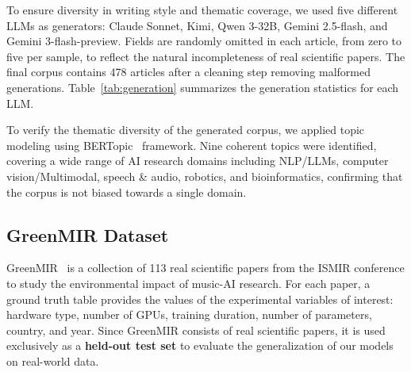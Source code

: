 \documentclass{article}
\theoremstyle{plain}
\theoremstyle{definition}
\theoremstyle{remark}
\begin{document}
To ensure diversity in writing style and thematic coverage, we used five different LLMs as generators: Claude Sonnet, Kimi, Qwen 3-32B, Gemini 2.5-flash, and Gemini 3-flash-preview. Fields are randomly omitted in each article, from zero to five per sample, to reflect the natural incompleteness of real scientific papers. The final corpus contains 478 articles after a cleaning step removing malformed generations. Table~\ref{tab:generation} summarizes the generation statistics for each LLM.

\begin{table}[H]
\centering
{}
\caption{Generation statistics per LLM.}
\label{tab:generation}
\end{table}

To verify the thematic diversity of the generated corpus, we applied topic modeling using BERTopic~\cite{grootendorst2022bertopic} framework. Nine coherent topics were identified, covering a wide range of AI research domains including NLP/LLMs, computer vision/Multimodal, speech \& audio, robotics, and bioinformatics, confirming that the corpus is not biased towards a single domain.

\subsection{GreenMIR Dataset}                                                 
GreenMIR~\cite{holzapfel2024green} is a collection of 113 real scientific papers from the ISMIR conference to study the environmental impact of music-AI research. For each paper, a ground truth table provides the values of the experimental variables of interest: hardware type, number of GPUs, training duration, number of parameters, country, and year. Since GreenMIR consists of real scientific papers, it is used exclusively as a \textbf{held-out test set} to evaluate the generalization of our models on real-world data.
\end{document}
